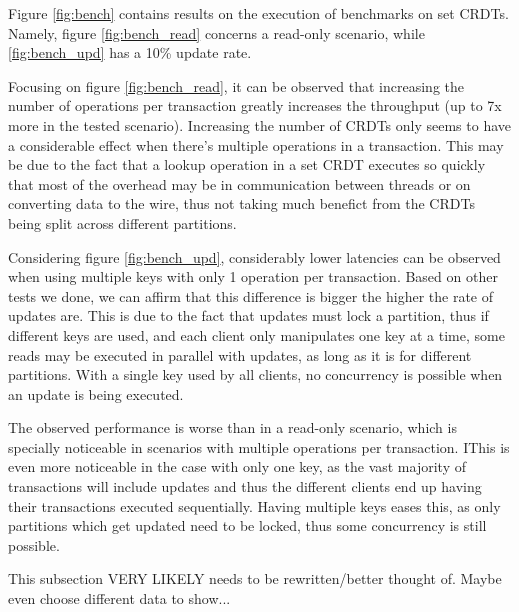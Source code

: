 \documentclass{vldb}
\newcommand{\grumbler}[2]{{\color{red}{\bf #1:} #2}}
\newcommand{\andre}[1]{\grumbler{andre}{#1}}
\begin{document}
Figure \ref{fig:bench} contains results on the execution of benchmarks on set CRDTs.
Namely, figure \ref{fig:bench_read} concerns a read-only scenario, while \ref{fig:bench_upd} has a 10\% update rate.

Focusing on figure \ref{fig:bench_read}, it can be observed that increasing the number of operations per transaction greatly increases the throughput (up to 7x more in the tested scenario).
Increasing the number of CRDTs only seems to have a considerable effect when there's multiple operations in a transaction.
This may be due to the fact that a lookup operation in a set CRDT executes so quickly that most of the overhead may be in communication between threads or on converting data to the wire, thus not taking much benefict from the CRDTs being split across different partitions.

Considering figure \ref{fig:bench_upd}, considerably lower latencies can be observed when using multiple keys with only 1 operation per transaction.
Based on other tests we done, we can affirm that this difference is bigger the higher the rate of updates are.
This is due to the fact that updates must lock a partition, thus if different keys are used, and each client only manipulates one key at a time, some reads may be executed in parallel with updates, as long as it is for different partitions.
With a single key used by all clients, no concurrency is possible when an update is being executed.

The observed performance is worse than in a read-only scenario, 
which is specially noticeable in scenarios with multiple operations per transaction.
IThis is even more noticeable in the case with only one key, as the vast majority of transactions will include updates and thus the different clients end up having their transactions executed sequentially.
Having multiple keys eases this, as only partitions which get updated need to be locked, thus some concurrency is still possible.

\andre{This subsection VERY LIKELY needs to be rewritten/better thought of. Maybe even choose different data to show...}
\end{document}
